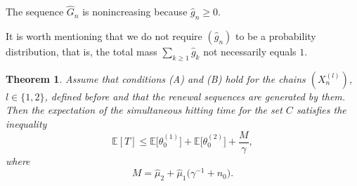 \documentclass[numbers,compress,v1.0.1]{vmsta}
\newtheorem{thm}{Theorem}
\theoremstyle{definition}
\begin{document}
The sequence $\hat G_n$ is nonincreasing because $\hat g_n \ge0$.

It is worth mentioning that we do not require $(\hat g_n)$ to be a
probability distribution, that is, the total mass $\sum_{k\ge1} \hat
g_k$ not necessarily equals $1$.

\begin{thm}\label{theorem1}
Assume that conditions (A) and (B) hold for the chains $(X^{(l)}_n)$,
$l\in\{1,2\}$, defined before and that the renewal sequences are
generated by them.
Then the expectation of the simultaneous hitting time for the set $C$
satisfies the inequality
%
\begin{equation}
\mathbb{E}[T] \le\mathbb{E}\bigl[\theta^{(1)}_0\bigr] +
\mathbb{E}\bigl[\theta ^{(2)}_0\bigr] + \frac{M}{\gamma},
\end{equation}
%
where
%
\begin{equation}
\label{m_def} M = \hat\mu_2 + \hat\mu_1 \bigl(
\gamma^{-1} + n_0\bigr).
\end{equation}
%
\end{thm}
%
\end{document}
